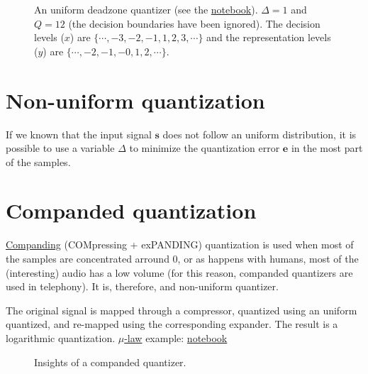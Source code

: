 \begin{figure}
  \caption{An uniform deadzone quantizer (see the
    \href{https://nbviewer.jupyter.org/github/vicente-gonzalez-ruiz/quantization/blob/master/graphics/deadzone.ipynb}{notebook}). $\Delta=1$
    and $Q=12$ (the decision boundaries have been ignored). The
    decision levels ($x$) are $\{\cdots,-3,-2,-1,1,2,3,\cdots\}$
    and the representation levels ($y$) are
    $\{\cdots,-2,-1,-0,1,2,\cdots\}$.}
  \label{fig:deadzone}
\end{figure}

\section{Non-uniform quantization}

If we known that the input signal ${\mathbf s}$ does not follow an
uniform distribution, it is possible to use a variable $\Delta$ to
minimize the quantization error ${\mathbf e}$ in the most part of the
samples.


\section{Companded quantization~\cite{sayood2017introduction}}

\href{https://en.wikipedia.org/wiki/Companding}{Companding}
(COMpressing + exPANDING) quantization is used when most of the
samples are concentrated arround 0, or as happens with humans, most of
the (interesting) audio has a low volume (for this reason, companded
quantizers are used in telephony). It is, therefore, and non-uniform
quantizer.

The original signal is mapped through a compressor, quantized using an
uniform quantized, and re-mapped using the corresponding expander. The
result is a logarithmic quantization.
\href{https://en.wikipedia.org/wiki/\%CE\%9C-law_algorithm}{\(\mu\)-law}
example:
\href{https://nbviewer.jupyter.org/github/vicente-gonzalez-ruiz/quantization/blob/master/graphics/companded_quantization.ipynb}{notebook}

\begin{figure}
  \caption{Insights of a companded quantizer.}
  \label{fig:companded_quantizer}
\end{figure}


